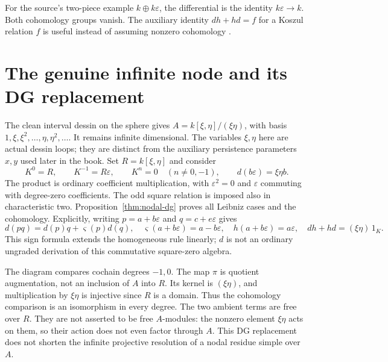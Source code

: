 For the source's two-piece example $k\oplus k\varepsilon$, the differential
is the identity $k\varepsilon\to k$. Both cohomology groups vanish.
The auxiliary identity $dh+hd=f$ for a Koszul relation $f$ is useful
instead of assuming nonzero cohomology \cite{StacksKoszulDG}.

\section{The genuine infinite node and its DG replacement}
The clean interval dessin on the sphere gives
$A=k[\xi,\eta]/(\xi\eta)$, with basis
$1,\xi,\xi^2,\ldots,\eta,\eta^2,\ldots$. It remains infinite dimensional.
The variables $\xi,\eta$ here are actual dessin loops; they are distinct
from the auxiliary persistence parameters $x,y$ used later in the book.
Set $R=k[\xi,\eta]$ and consider
\[
 K^0=R,\qquad K^{-1}=R\varepsilon,\qquad K^n=0\quad(n\ne0,-1),
 \qquad d(b\varepsilon)=\xi\eta b.
\]
The product is ordinary coefficient multiplication, with
$\varepsilon^2=0$ and $\varepsilon$ commuting with degree-zero coefficients.
The odd square relation is imposed also in characteristic two.
Proposition~\ref{thm:nodal-dg} proves all Leibniz cases and the cohomology.
Explicitly, writing $p=a+b\varepsilon$ and $q=c+e\varepsilon$ gives
\[
 d(pq)=d(p)q+\varsigma(p)d(q),\quad
 \varsigma(a+b\varepsilon)=a-b\varepsilon,\quad
 h(a+b\varepsilon)=a\varepsilon,\quad dh+hd=(\xi\eta)\,1_K.
\]
This sign formula extends the homogeneous rule linearly; $d$ is not an
ordinary ungraded derivation of this commutative square-zero algebra.

\begin{center}
\end{center}
The diagram compares cochain degrees $-1,0$. The map $\pi$ is quotient
augmentation, not an inclusion of $A$ into $R$. Its kernel is $(\xi\eta)$,
and multiplication by $\xi\eta$ is injective since $R$ is a domain.
Thus the cohomology comparison is an isomorphism in every degree.
The two ambient terms are free over $R$. They are not asserted to be free
$A$-modules: the nonzero element $\xi\eta$ acts on them, so their action
does not even factor through $A$. This DG replacement does not shorten the
infinite projective resolution of a nodal residue simple over $A$.

